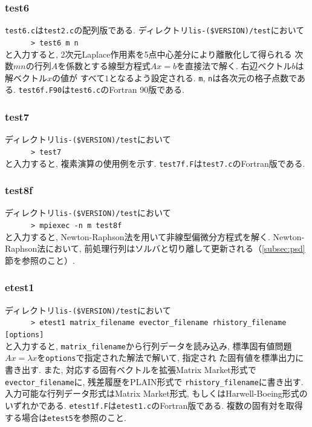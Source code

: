\documentclass[a4paper]{jarticle}
\begin{document}
{{\subsubsection{test6}
{\tt test6.c}は{\tt test2.c}の配列版である. 
ディレクトリ{\tt lis-(\$VERSION)/test}において\\
 \verb+      > test6 m n+\\
と入力すると, 2次元Laplace作用素を5点中心差分により離散化して得られる
次数$mn$の行列$A$を係数とする線型方程式$Ax=b$を直接法で解く.
右辺ベクトル$b$は解ベクトル$x$の値が
すべて$1$となるよう設定される. {\tt m}, {\tt n}は各次元の格子点数である. 
{\tt test6f.F90}は{\tt test6.c}のFortran 90版である.

\subsubsection{test7}
ディレクトリ{\tt lis-(\$VERSION)/test}において\\
 \verb+      > test7+\\
と入力すると, 複素演算の使用例を示す.
{\tt test7f.F}は{\tt test7.c}のFortran版である.

\subsubsection{test8f}

ディレクトリ{\tt lis-(\$VERSION)/test}において\\
 \verb+      > mpiexec -n m test8f+\\
 と入力すると, Newton-Raphson法を用いて非線型偏微分方程式を解く.
Newton-Raphson法において, 前処理行列はソルバと切り離して更新される（\ref{subsec:psd}節を参照のこと）.

\subsubsection{etest1}
ディレクトリ{\tt lis-(\$VERSION)/test}において\\
 \verb+      > etest1 matrix_filename evector_filename rhistory_filename [options]+\\
と入力すると, {\tt matrix\_filename}から行列データを読み込み, 
標準固有値問題$Ax=\lambda x$を{\tt options}で指定された解法で解いて, 指定され
た固有値を標準出力に書き出す. また, 対応する固有ベクトルを拡張Matrix
 Market形式で{\tt evector\_filename}に, 残差履歴をPLAIN形式で
{\tt rhistory\_filename}に書き出す. 
入力可能な行列データ形式はMatrix Market形式, もしくはHarwell-Boeing形式の
いずれかである. 
{\tt etest1f.F}は{\tt etest1.c}のFortran版である. 
複数の固有対を取得する場合は{\tt etest5}を参照のこと.

}}
\end{document}
